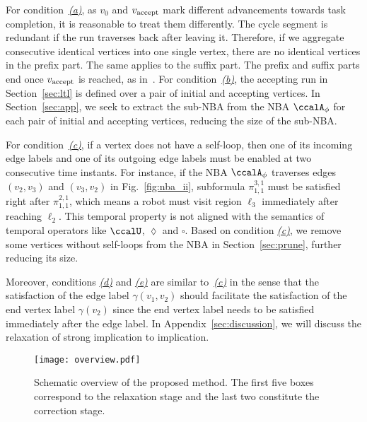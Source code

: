 \documentclass[Afour,sageh,times]{sagej}
\newcommand{\autop}{\ccalA_{\phi}}
\newcommand{\vertex}[1]{v_{\textup{#1}}}
\renewcommand{\ap}[3]{\mathcal{\pi}_{{#1},{#2}}^{#3}}
\begin{document}
For condition~\hyperref[cond:a]{\it (a)}, as $v_0$ and $\vertex{accept}$ mark different advancements towards task completion, it is reasonable to treat them  differently. The cycle segment is redundant if the run traverses back after leaving it. Therefore, if we aggregate consecutive identical vertices into one single vertex, there are no identical vertices in the prefix part. The same applies to the suffix part. The prefix and suffix parts end once  $\vertex{accept}$ is reached, as in~\cite{smith2010optimal}.
      For condition~\hyperref[cond:b]{\it (b)}, the accepting run in Section~\ref{sec:ltl} is defined over a pair of initial and accepting vertices. In Section~\ref{sec:app}, we seek to extract the sub-NBA from the NBA $\autop$ for each pair of initial and accepting vertices, reducing the size of the sub-NBA.

      For condition~\hyperref[cond:c]{\it (c)}, if a vertex does not have a self-loop, then one of its incoming edge labels  and one of its outgoing edge labels  must be enabled at two consecutive time instants. For instance, if the NBA $\autop$ traverses edges $(v_2, v_3)$ and $(v_3, v_2)$ in Fig.~\ref{fig:nba_ii}, subformula $\ap{1}{1}{3,1}$ must be satisfied right after $\ap{1}{1}{2,1}$, which means a robot  must visit region $\ell_3$ immediately after reaching $\ell_2$. This temporal property is not aligned with the semantics of temporal operators like $\ccalU$, $\lozenge$ and $\square$. Based on condition \hyperref[cond:c]{\it (c)}, we   remove some vertices without self-loops from the NBA in Section~\ref{sec:prune}, further reducing its size.

      Moreover, conditions \hyperref[cond:d]{\it (d)} and \hyperref[cond:e]{\it (e)} are similar to~\hyperref[cond:c]{\it (c)} in the sense that  the satisfaction of the edge label $\gamma(v_1, v_2)$ should facilitate the satisfaction of the end vertex label $\gamma(v_2)$ since the end vertex label needs to be satisfied immediately after the edge label. %
      In Appendix~\ref{sec:discussion}, we will discuss the relaxation of strong implication to implication.
\begin{figure*}[!t]
   \centering
\texttt{[image: overview.pdf]}
   \caption{Schematic overview of the proposed method.  The first five boxes correspond to the relaxation stage and the last two constitute the correction stage.}
\label{fig:overview}
\end{figure*}
\end{document}
